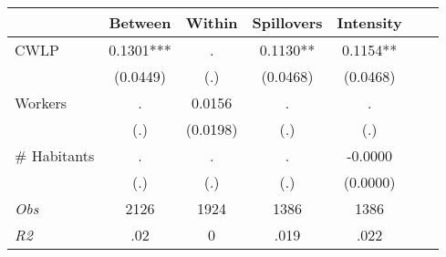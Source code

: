 \begin{tabular}{l*{6}{c}}\hline&\multicolumn{1}{c}{Between}&\multicolumn{1}{c}{Within}&\multicolumn{1}{c}{Spillovers}&\multicolumn{1}{c}{Intensity}\\ \hline 
CWLP & 0.1301*** & . & 0.1130** & 0.1154** \\
 & (0.0449) & (.) & (0.0468) & (0.0468) \\
Workers & . & 0.0156 & . & . \\
 & (.) & (0.0198) & (.) & (.) \\
\# Habitants & . & . & . & -0.0000 \\
  & (.) & (.) & (.) & (0.0000) \\
\hline \textit{Obs} & 2126 & 1924 & 1386 & 1386  \\ \textit{R2} & .02 & 0 & .019 & .022 \\ \hline \end{tabular}
